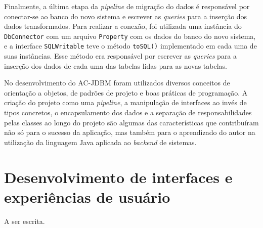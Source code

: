 Finalmente, a última etapa da \textit{pipeline} de migração do dados é responsável por conectar-se ao banco do novo sistema e escrever as \textit{queries} para a inserção dos dados transformados. Para realizar a conexão, foi utilizada uma instância do \verb|DbConnector| com um arquivo \verb|Property| com os dados do banco do novo sistema, e a interface \verb|SQLWritable| teve o método \verb|toSQL()| implementado em cada uma de suas instâncias. Esse método era responsável por escrever as \textit{queries} para a inserção dos dados de cada uma das tabelas lidas para as novas tabelas.

No desenvolvimento do AC-JDBM foram utilizados diversos conceitos de orientação a objetos, de padrões de projeto e boas práticas de programação.  A criação do projeto como uma \textit{pipeline}, a manipulação de interfaces ao invés de tipos concretos, o encapsulamento dos dados e a separação de responsabilidades pelas classes ao longo do projeto são algumas das características que contribuíram não só para o sucesso da aplicação, mas também para o aprendizado do autor na utilização da linguagem Java aplicada ao \textit{backend} de sistemas.

\section{Desenvolvimento de interfaces e experiências de usuário}
\label{sec:ui-ux-atividades}

A ser escrita.
